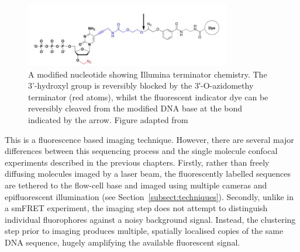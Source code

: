 \begin{figure}
\centerline{\includegraphics[width=0.8\textwidth]{illumina/illumina_linker.pdf}}
\caption{A modified nucleotide showing Illumina terminator chemistry. The 3'-hydroxyl group is reversibly blocked by the 3′-O-azidomethy terminator (red atoms), whilst the fluorescent indicator dye can be reversibly cleaved from the modified DNA base at the bond indicated by the arrow. Figure adapted from~\cite{Chen2013}}
\label{fig:terminator}
\end{figure}  

This is a fluorescence based imaging technique. However, there are several major differences between this sequencing process and the single molecule confocal experiments described in the previous chapters. Firstly, rather than freely diffusing molecules imaged by a laser beam, the fluorescently labelled sequences are tethered to the flow-cell base and imaged using multiple cameras and epifluorescent illumination (see Section~\ref{subsect:techniques}). Secondly, unlike in a smFRET experiment, the imaging step does not attempt to distinguish individual fluorophores against a noisy background signal. Instead, the clustering step prior to imaging produces multiple, spatially localised copies of the same DNA sequence, hugely amplifying the available fluorescent signal. 

